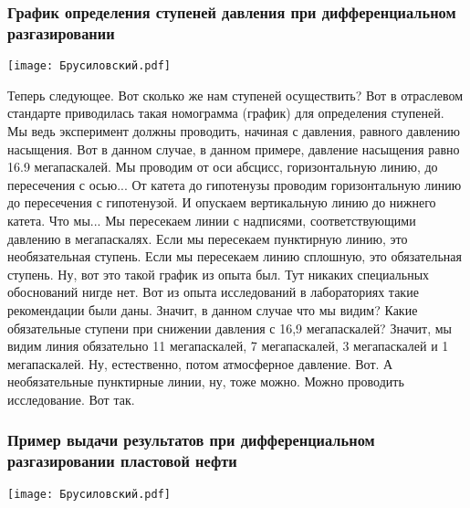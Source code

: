 \documentclass[main.tex]{subfiles}
\begin{document}
\subsubsection{График определения ступеней давления при дифференциальном разгазировании}

\begin{center}
\texttt{[image: Брусиловский.pdf]}
\end{center}

Теперь следующее.
Вот сколько же нам ступеней осуществить?
Вот в отраслевом стандарте приводилась такая номограмма (график) для определения ступеней.
Мы ведь эксперимент должны проводить, начиная с давления, равного давлению насыщения.
Вот в данном случае, в данном примере, давление насыщения равно 16.9 мегапаскалей.
Мы проводим от оси абсцисс, горизонтальную линию, до пересечения с осью...
От катета до гипотенузы проводим горизонтальную линию до пересечения с гипотенузой.
И опускаем вертикальную линию до нижнего катета.
Что мы...
Мы пересекаем линии с надписями, соответствующими давлению в мегапаскалях.
Если мы пересекаем пунктирную линию, это необязательная ступень.
Если мы пересекаем линию сплошную, это обязательная ступень.
Ну, вот это такой график из опыта был.
Тут никаких специальных обоснований нигде нет.
Вот из опыта исследований в лабораториях такие рекомендации были даны.
Значит, в данном случае что мы видим?
Какие обязательные ступени при снижении давления с 16,9 мегапаскалей?
Значит, мы видим линия обязательно 11 мегапаскалей, 7 мегапаскалей, 3 мегапаскалей и 1 мегапаскалей.
Ну, естественно, потом атмосферное давление.
Вот.
А необязательные пунктирные линии, ну, тоже можно.
Можно проводить исследование.
Вот так.

\subsubsection{Пример выдачи результатов при дифференциальном разгазировании пластовой нефти}

\begin{center}
\texttt{[image: Брусиловский.pdf]}
\end{center}
\end{document}
